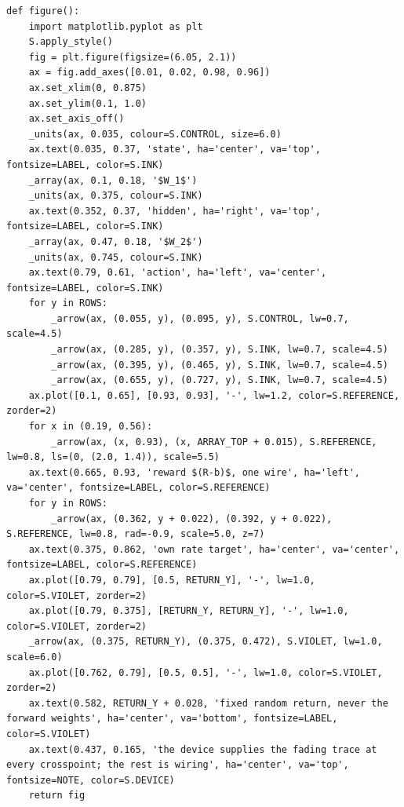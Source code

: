 \documentclass[a4paper,10pt]{article}
\begin{document}
\begin{Verbatim}
def figure():
    import matplotlib.pyplot as plt
    S.apply_style()
    fig = plt.figure(figsize=(6.05, 2.1))
    ax = fig.add_axes([0.01, 0.02, 0.98, 0.96])
    ax.set_xlim(0, 0.875)
    ax.set_ylim(0.1, 1.0)
    ax.set_axis_off()
    _units(ax, 0.035, colour=S.CONTROL, size=6.0)
    ax.text(0.035, 0.37, 'state', ha='center', va='top', fontsize=LABEL, color=S.INK)
    _array(ax, 0.1, 0.18, '$W_1$')
    _units(ax, 0.375, colour=S.INK)
    ax.text(0.352, 0.37, 'hidden', ha='right', va='top', fontsize=LABEL, color=S.INK)
    _array(ax, 0.47, 0.18, '$W_2$')
    _units(ax, 0.745, colour=S.INK)
    ax.text(0.79, 0.61, 'action', ha='left', va='center', fontsize=LABEL, color=S.INK)
    for y in ROWS:
        _arrow(ax, (0.055, y), (0.095, y), S.CONTROL, lw=0.7, scale=4.5)
        _arrow(ax, (0.285, y), (0.357, y), S.INK, lw=0.7, scale=4.5)
        _arrow(ax, (0.395, y), (0.465, y), S.INK, lw=0.7, scale=4.5)
        _arrow(ax, (0.655, y), (0.727, y), S.INK, lw=0.7, scale=4.5)
    ax.plot([0.1, 0.65], [0.93, 0.93], '-', lw=1.2, color=S.REFERENCE, zorder=2)
    for x in (0.19, 0.56):
        _arrow(ax, (x, 0.93), (x, ARRAY_TOP + 0.015), S.REFERENCE, lw=0.8, ls=(0, (2.0, 1.4)), scale=5.5)
    ax.text(0.665, 0.93, 'reward $(R-b)$, one wire', ha='left', va='center', fontsize=LABEL, color=S.REFERENCE)
    for y in ROWS:
        _arrow(ax, (0.362, y + 0.022), (0.392, y + 0.022), S.REFERENCE, lw=0.8, rad=-0.9, scale=5.0, z=7)
    ax.text(0.375, 0.862, 'own rate target', ha='center', va='center', fontsize=LABEL, color=S.REFERENCE)
    ax.plot([0.79, 0.79], [0.5, RETURN_Y], '-', lw=1.0, color=S.VIOLET, zorder=2)
    ax.plot([0.79, 0.375], [RETURN_Y, RETURN_Y], '-', lw=1.0, color=S.VIOLET, zorder=2)
    _arrow(ax, (0.375, RETURN_Y), (0.375, 0.472), S.VIOLET, lw=1.0, scale=6.0)
    ax.plot([0.762, 0.79], [0.5, 0.5], '-', lw=1.0, color=S.VIOLET, zorder=2)
    ax.text(0.582, RETURN_Y + 0.028, 'fixed random return, never the forward weights', ha='center', va='bottom', fontsize=LABEL, color=S.VIOLET)
    ax.text(0.437, 0.165, 'the device supplies the fading trace at every crosspoint; the rest is wiring', ha='center', va='top', fontsize=NOTE, color=S.DEVICE)
    return fig
\end{Verbatim}
\end{document}

